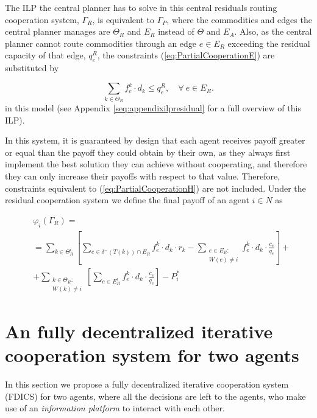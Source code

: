 \documentclass{article}
\begin{document}
The ILP the central planner has to solve in this central residuals routing cooperation system, $\Gamma_R$, is equivalent to $\Gamma_P$, where the commodities and edges the central planner manages are $\Theta_R$ and $E_R$ instead of $\Theta$ and $E_A$. Also, as the central planner cannot route commodities through an edge $e\in E_R$ exceeding the residual capacity of that edge, $q_e^R$, the constraints (\ref{eq:PartialCooperationE}) are substituted by

\begin{equation}
\sum_{k \in \Theta_R} f_e^k\cdot d_k \leq q_e^R,\quad \forall\ e \in E_R.
\end{equation}
in this model (see Appendix \ref{seq:appendixilpresidual} for a full overview of this ILP).
    
In this system, it is guaranteed by design that each agent receives  payoff greater or equal than the payoff they could obtain by their own, as they always first implement the best solution they can achieve without cooperating, and therefore they can only increase their payoffs with respect to that value. Therefore, constraints equivalent to (\ref{eq:PartialCooperationH}) are not included. Under the residual cooperation system we define the final payoff of an agent $i\in N$ as

\begin{equation}
    \begin{split}
    & \varphi_i(\Gamma_R) =\label{eq:ResidualCooperationPayoff} \\
    & = \sum_{k\in \Theta^i_R} \left[ \sum_{e \in \delta^-(T(k))\cap E_R} f_e^k \cdot d_k \cdot r_k -  \sum_{\substack{e\in E_R \colon\\ W(e)\not = i}} f_e^k \cdot d_k \cdot \frac{c_e}{q_e} \right] + \\
    & + \sum_{\substack{k \in \Theta_R  \colon \\ W(k) \not = i}} \left[\sum_{e \in E_R^i} f_e^k \cdot d_k \cdot \frac{c_e}{q_e}\right] - P_i^*
    \end{split}
\end{equation}


\section{An fully decentralized iterative cooperation system for two agents} \label{seq:itermodel}

In this section we propose a fully decentralized iterative cooperation system (FDICS) for two agents, where all the decisions are left to the agents, who make use of an \emph{information platform} to interact with each other.
\end{document}
